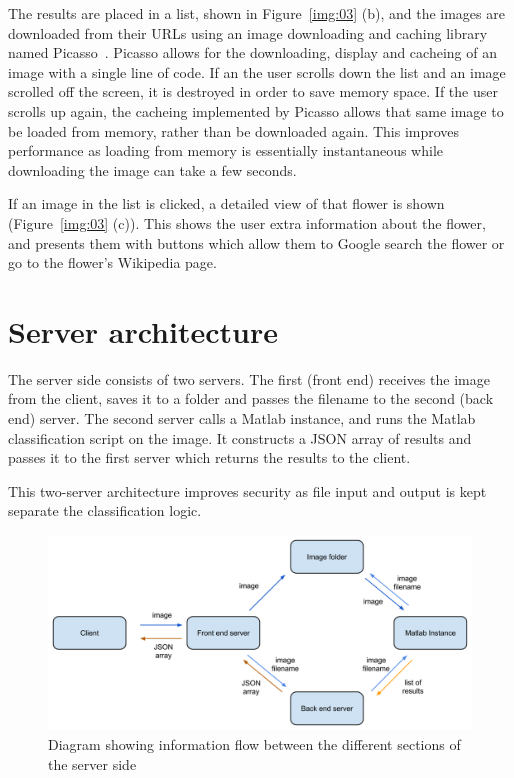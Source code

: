 \documentclass[11pt, a4paper]{report}
\begin{document}
The results are placed in a list, shown in Figure~\ref{img:03} (b), and the images are downloaded from their URLs using an image downloading and caching library named Picasso~\cite{AndroidDev:Picasso}. Picasso allows for the downloading, display and cacheing of an image with a single line of code. If an the user scrolls down the list and an image scrolled off the screen, it is destroyed in order to save memory space. If the user scrolls up again, the cacheing implemented by Picasso allows that same image to be loaded from memory, rather than be downloaded again. This improves performance as loading from memory is essentially instantaneous while downloading the image can take a few seconds.

If an image in the list is clicked, a detailed view of that flower is shown (Figure~\ref{img:03} (c)). This shows the user extra information about the flower, and presents them with buttons which allow them to Google search the flower or go to the flower's Wikipedia page. 



\section{Server architecture}


The server side consists of two servers. The first (front end) receives the image from the client, saves it to a folder and passes the filename to the second (back end) server. The second server calls a Matlab instance, and runs the Matlab classification script on the image. It constructs a JSON array of results and passes it to the first server which returns the results to the client. 

This two-server architecture improves security as file input and output is kept separate the classification logic.

\begin{figure}[hbt]
	\centering
  \includegraphics[totalheight=8cm]{img/07.png}
  \caption{Diagram showing information flow between the different sections of the server side}
  \label{svg:01}
\end{figure}
\end{document}
